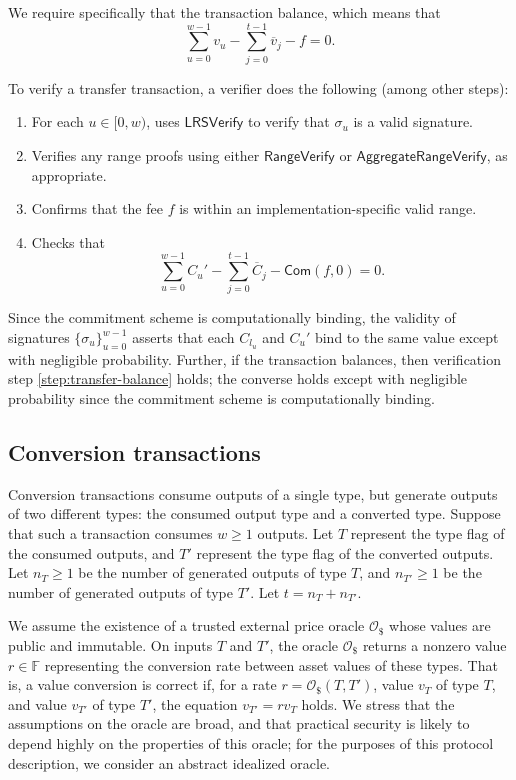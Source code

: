 \documentclass{article}
\newcommand{\F}{\mathbb{F}}
\newcommand{\func}[1]{\mathsf{#1}}
\newcommand{\com}{\func{Com}}
\newcommand{\oracle}{\mathcal{O}_{\$}}
\begin{document}
We require specifically that the transaction balance, which means that $$\sum_{u=0}^{w-1} v_u - \sum_{j=0}^{t-1} \overline{v}_j - f = 0.$$

To verify a transfer transaction, a verifier does the following (among other steps):
\begin{enumerate}
    \item For each $u \in [0,w)$, uses $\func{LRSVerify}$ to verify that $\sigma_u$ is a valid signature.
    \item Verifies any range proofs using either $\func{RangeVerify}$ or $\func{AggregateRangeVerify}$, as appropriate.
    \item Confirms that the fee $f$ is within an implementation-specific valid range.
    \item\label{step:transfer-balance} Checks that $$\sum_{u=0}^{w-1} C_u' - \sum_{j=0}^{t-1} \overline{C}_j - \com(f,0) = 0.$$
\end{enumerate}

Since the commitment scheme is computationally binding, the validity of signatures $\{\sigma_u\}_{u=0}^{w-1}$ asserts that each $C_{l_u}$ and $C_u'$ bind to the same value except with negligible probability.
Further, if the transaction balances, then verification step \ref{step:transfer-balance} holds; the converse holds except with negligible probability since the commitment scheme is computationally binding.


\subsection{Conversion transactions}

Conversion transactions consume outputs of a single type, but generate outputs of two different types: the consumed output type and a converted type.
Suppose that such a transaction consumes $w \geq 1$ outputs.
Let $T$ represent the type flag of the consumed outputs, and $T'$ represent the type flag of the converted outputs.
Let $n_T \geq 1$ be the number of generated outputs of type $T$, and $n_{T'} \geq 1$ be the number of generated outputs of type $T'$.
Let $t = n_T + n_{T'}$.

We assume the existence of a trusted external price oracle $\oracle$ whose values are public and immutable.
On inputs $T$ and $T'$, the oracle $\oracle$ returns a nonzero value $r \in \F$ representing the conversion rate between asset values of these types.
That is, a value conversion is correct if, for a rate $r = \oracle(T,T')$, value $v_T$ of type $T$, and value $v_{T'}$ of type $T'$, the equation $v_{T'} = rv_T$ holds.
We stress that the assumptions on the oracle are broad, and that practical security is likely to depend highly on the properties of this oracle; for the purposes of this protocol description, we consider an abstract idealized oracle.
\end{document}
